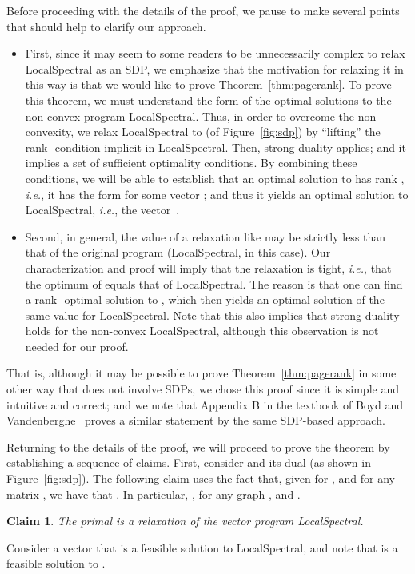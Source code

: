 \documentclass[11pt]{article}
\newtheorem{claim}{Claim}
\newenvironment{proof}{\noindent {\em Proof:}}{\\\hspace*{\fill}\mbox{}}
\begin{document}
Before proceeding with the details of the proof, we pause to make several 
points that should help to clarify our approach.
\begin{itemize}
\item
First, since it may seem to some readers to be unnecessarily complex to relax 
\textsf{LocalSpectral} as an SDP, we emphasize that the motivation for 
relaxing it in this way is that we would like to prove 
Theorem~\ref{thm:pagerank}.
To prove this theorem, we must understand the form of the optimal solutions 
to the non-convex program \textsf{LocalSpectral}. 
Thus, in order to overcome the non-convexity, we relax \textsf{LocalSpectral} 
to  (of Figure~\ref{fig:sdp}) by ``lifting'' the 
rank- condition implicit in \textsf{LocalSpectral}. 
Then, strong duality applies; and it implies a set of sufficient optimality 
conditions. 
By combining these conditions, we will be able to establish that an optimal 
solution  to  has rank , \emph{i.e.}, it has the 
form  for some vector ; and thus it yields an optimal solution 
to \textsf{LocalSpectral}, \emph{i.e.}, the vector~. 
\item
Second, in general, the value of a relaxation like  
may be strictly less than that of the original program 
(\textsf{LocalSpectral}, in this case). 
Our characterization and proof will imply that the relaxation is tight, 
\emph{i.e.}, that the optimum of  equals that of 
\textsf{LocalSpectral}.
The reason is that one can find a rank- optimal solution to 
, which then yields an optimal solution of the same 
value for \textsf{LocalSpectral}. 
Note that this also implies that strong duality holds for the non-convex 
\textsf{LocalSpectral}, although this observation is not needed for our 
proof.
\end{itemize}
\noindent
That is, although it may be possible to prove Theorem~\ref{thm:pagerank} in 
some other way that does not involve SDPs, we 
chose this proof since it is simple and intuitive and correct; and we 
note that Appendix B in the textbook of Boyd and Vandenberghe~\cite{Boyd04} 
proves a similar statement by the same SDP-based approach.




Returning to the details of the proof, we will 
proceed to prove the theorem by establishing a sequence of claims.
First, consider  and its dual  (as 
shown in Figure~\ref{fig:sdp}). 
The following claim uses the fact that, given  for 
, and for any matrix , we 
have that . 
In particular, , for any graph , and 
.

\begin{claim}
The primal  is a relaxation of the vector program 
\textsf{LocalSpectral}.
\end{claim}
\begin{proof} Consider a vector  that is a feasible solution to 
\textsf{LocalSpectral}, and note that  is a feasible 
solution to .
\end{proof}
\end{document}
